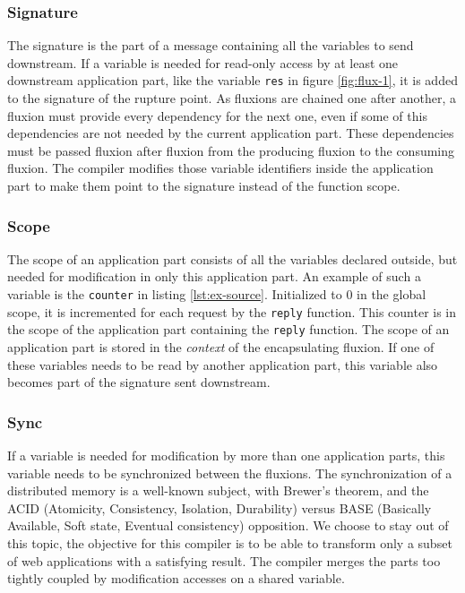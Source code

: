 \subsubsection{Signature}

The signature is the part of a message containing all the variables to send downstream.
If a variable is needed for read-only access by at least one downstream application part, like the variable \texttt{res} in figure \ref{fig:flux-1}, it is added to the signature of the rupture point.
As fluxions are chained one after another, a fluxion must provide every dependency for the next one, even if some of this dependencies are not needed by the current application part.
These dependencies must be passed fluxion after fluxion from the producing fluxion to the consuming fluxion.
The compiler modifies those variable identifiers inside the application part to make them point to the signature instead of the function scope.

\subsubsection{Scope}

The scope of an application part consists of all the variables declared outside, but needed for modification in only this application part.
An example of such a variable is the \texttt{counter} in listing \ref{lst:ex-source}.
Initialized to 0 in the global scope, it is incremented for each request by the \texttt{reply} function.
This counter is in the scope of the application part containing the \texttt{reply} function.
The scope of an application part is stored in the \textit{context} of the encapsulating fluxion.
If one of these variables needs to be read by another application part, this variable also becomes part of the signature sent downstream.

\subsubsection{Sync}

If a variable is needed for modification by more than one application parts, this variable needs to be synchronized between the fluxions.
The synchronization of a distributed memory is a well-known subject, with Brewer's theorem\cite{Gilbert2002}\cite{codahale2010}, and the ACID (Atomicity, Consistency, Isolation, Durability) versus BASE (Basically Available, Soft state, Eventual consistency) opposition\cite{Fox1997}.
We choose to stay out of this topic, the objective for this compiler is to be able to transform only a subset of web applications with a satisfying result.
The compiler merges the parts too tightly coupled by modification accesses on a shared variable.

